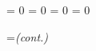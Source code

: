 %
\newif\ifmesslines      \messlinesfalse
\newif\ifdiagnos        \diagnosfalse
\newif\ifinscore        \inscorefalse
\newif\ifchop		\chopfalse
 
\newcount\toobigct      \toobigct = 0
\newcount\donebits      \donebits = 0
\newcount\incontinuation \incontinuation = 0
\newcount\notect	\notect = 0
 
\newtoks\txttoks        %
\newtoks\sigtoks	%
\newtoks\everyscore	%
\newtoks\conttoks	%

 
\def\diagnostics{\diagnostrue\messlinestrue\scrollmode
  \output={\global\setbox255\vbox{}\shipout\box255\global\advance\count0 by1}}
 
\def\nodiagnostics{\diagnosfalse\messlinesfalse\errorstopmode
  \global\output={\plainoutput}}

\newtoks\txtfonts@ze  \newtoks\numfonts@ze  \newtoks\scofonts@ze 
\newtoks\txtpoints@ze \newtoks\sigpoints@ze

\def\settxtfnt{\globaldefs1 \csname\txtfnt@ point\endcsname \globaldefs0 \sum }
\def\setscofnt{\globaldefs1 \csname\scofnt@ point\endcsname \globaldefs0 \sum }
\def\txtfnt{\csname\the\txtfonts@ze\endcsname\sum}
\def\numfnt{\csname\the\numfonts@ze\endcsname\bf}
\def\siglumfnt{\csname\the\txtfonts@ze\endcsname\sum}
\def\scofnt{\csname\the\scofonts@ze\endcsname\sum}

\def\setupfonts{%
	\savecurrsize
	\numfonts@ze{ten}%
	\txtfonts@ze{ten}%
	\scofonts@ze{eight}%
	\edef\txtfnt@{ten}%
	\edef\scofnt@{eight}}
\def\savecurrsize{\edef\svdfnt@{\the\FLODintsize}}
\def\restoresize{\globaldefs1 \csname\svdfnt@ point\endcsname\rm\globaldefs0 }

\conttoks={{\it(cont.)}\ }

\let\Hw\hidewidth
\let\Ms\multispan
\let\Om\omit
\let\@\span %

\def\BeginBlock{%
	\global\advance\donebits by 1
        \ifnum\donebits = 1 %
	  \else\vskip\interscoreskip
	\fi
        \global\setbox0=\vbox\bgroup}

